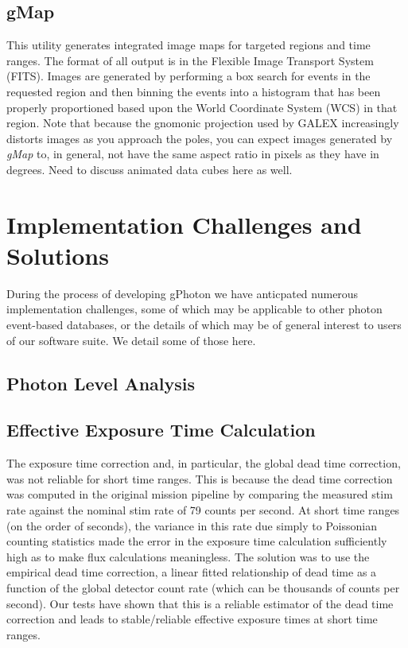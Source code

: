 \documentclass[preprint]{aastex}
\begin{document}
\subsection{gMap}
This utility generates integrated image maps for targeted regions and time ranges. The format of all output is in the Flexible Image Transport System (FITS). Images are generated by performing a box search for events in the requested region and then binning the events into a histogram that has been properly proportioned based upon the World Coordinate System (WCS) in that region. Note that because the gnomonic projection used by GALEX increasingly distorts images as you approach the poles, you can expect images generated by \textit{gMap} to, in general, not have the same aspect ratio in pixels as they have in degrees. {\color{red}Need to discuss animated data cubes here as well.}

\section{Implementation Challenges and Solutions}
\label{implementation}
During the process of developing gPhoton we have anticpated numerous implementation challenges, some of which may be applicable to other photon event-based databases, or the details of which may be of general interest to users of our software suite.  We detail some of those here.

\subsection{Photon Level Analysis}

\subsection{Effective Exposure Time Calculation}
The exposure time correction and, in particular, the global dead time correction, was not reliable for short time ranges. This is because the dead time correction was computed in the original mission pipeline by comparing the measured stim rate against the nominal stim rate of 79 counts per second. At short time ranges (on the order of seconds), the variance in this rate due simply to Poissonian counting statistics made the error in the exposure time calculation sufficiently high as to make flux calculations meaningless. The solution was to use the empirical dead time correction, a linear fitted relationship of dead time as a function of the global detector count rate (which can be thousands of counts per second). Our tests have shown that this is a reliable estimator of the dead time correction and leads to stable/reliable effective exposure times at short time ranges.
\end{document}
